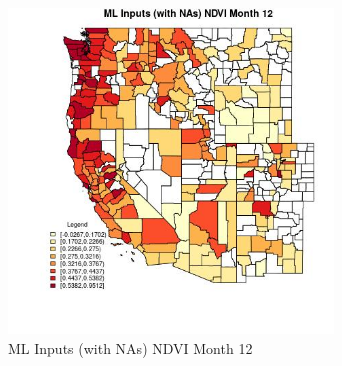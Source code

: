 \begin{figure} 
\centering  
\includegraphics[width=0.77\textwidth]{Code_Outputs/Report_ML_input_PM25_Step4_part_f_de_duplicated_aveswNAs_CountyNDVImedianMonth12.jpg} 
\caption{\label{fig:Report_ML_input_PM25_Step4_part_f_de_duplicated_aveswNAsCountyNDVImedianMonth12}ML Inputs (with NAs) NDVI Month 12} 
\end{figure} 
 
